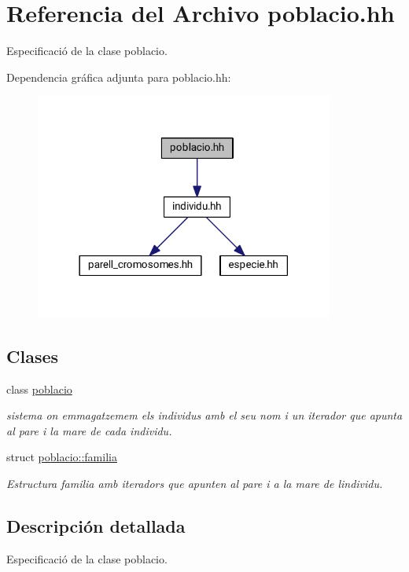 \hypertarget{poblacio_8hh}{}\section{Referencia del Archivo poblacio.\+hh}
\label{poblacio_8hh}


Especificació de la clase poblacio.  


Dependencia gráfica adjunta para poblacio.\+hh\+:\nopagebreak
\begin{figure}[H]
\begin{center}
\leavevmode
\includegraphics[width=278pt]{poblacio_8hh__incl}
\end{center}
\end{figure}
\subsection*{Clases}
\begin{DoxyCompactItemize}
\item 
class \hyperlink{classpoblacio}{poblacio}
\begin{DoxyCompactList}\small\item\em sistema on emmagatzemem els individus amb el seu nom i un iterador que apunta al pare i la mare de cada individu. \end{DoxyCompactList}\item 
struct \hyperlink{structpoblacio_1_1familia}{poblacio\+::familia}
\begin{DoxyCompactList}\small\item\em Estructura familia amb iteradors que apunten al pare i a la mare de l\textquotesingle{}individu. \end{DoxyCompactList}\end{DoxyCompactItemize}


\subsection{Descripción detallada}
Especificació de la clase poblacio. 

